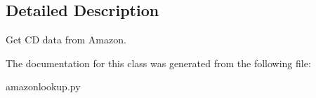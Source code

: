 \subsection{Detailed Description}
\begin{DoxyVerb}Get CD data from Amazon.

\end{DoxyVerb}
 

The documentation for this class was generated from the following file:\begin{DoxyCompactItemize}
\item 
amazonlookup.py\end{DoxyCompactItemize}
